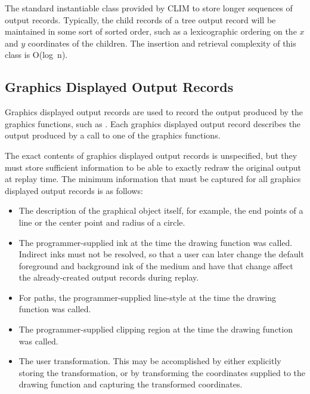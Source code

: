 
The standard instantiable class provided by CLIM to store longer sequences of
output records.  Typically, the child records of a tree output record will be
maintained in some sort of sorted order, such as a lexicographic ordering on the
$x$ and $y$ coordinates of the children.  The insertion and retrieval complexity
of this class is O(log~n).


\subsection {Graphics Displayed Output Records}

Graphics displayed output records are used to record the output produced by the
graphics functions, such as .  Each graphics displayed output
record describes the output produced by a call to one of the graphics functions.

The exact contents of graphics displayed output records is unspecified, but they
must store sufficient information to be able to exactly redraw the original
output at replay time.  The minimum information that must be captured for
all graphics displayed output records is as follows:

\begin{itemize}
\item The description of the graphical object itself, for example, the end
points of a line or the center point and radius of a circle.

\item The programmer-supplied ink at the time the drawing function was called.
Indirect inks must not be resolved, so that a user can later change the default
foreground and background ink of the medium and have that change affect the
already-created output records during replay.

\item For paths, the programmer-supplied line-style at the time the drawing
function was called.

\item The programmer-supplied clipping region at the time the drawing function
was called.

\item The user transformation.  This may be accomplished by either explicitly
storing the transformation, or by transforming the coordinates supplied to the
drawing function and capturing the transformed coordinates.
\end{itemize}


